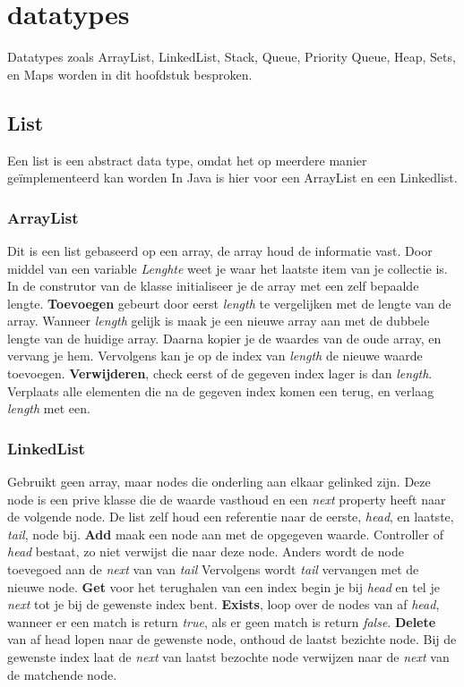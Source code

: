 \section{datatypes}
Datatypes zoals ArrayList, LinkedList, Stack, Queue, Priority Queue, Heap, Sets, en Maps worden in dit hoofdstuk besproken.

\subsection{List}
Een list is een abstract data type, omdat het op meerdere manier geïmplementeerd kan worden
In Java is hier voor een ArrayList en een Linkedlist.

\subsubsection{ArrayList}
Dit is een list gebaseerd op een array, de array houd de informatie vast.
Door middel van een variable \textit{Lenghte} weet je waar het laatste item van je collectie is.
In de construtor van de klasse initialiseer je de array met een zelf bepaalde lengte.
\textbf{Toevoegen} gebeurt door eerst \textit{length} te vergelijken met de lengte van de array.
Wanneer \textit{length} gelijk is maak je een nieuwe array aan met de dubbele lengte van de huidige array.
Daarna kopier je de waardes van de oude array, en vervang je hem.
Vervolgens kan je op de index van \textit{length} de nieuwe waarde toevoegen.
\textbf{Verwijderen}, check eerst of de gegeven index lager is dan \textit{length}.
Verplaats alle elementen die na de gegeven index komen een terug, en verlaag \textit{length} met een.

\subsubsection{LinkedList}
Gebruikt geen array, maar nodes die onderling aan elkaar gelinked zijn.
Deze node is een prive klasse die de waarde vasthoud en een \textit{next} property heeft naar de volgende node.
De list zelf houd een referentie naar de eerste, \textit{head}, en laatste, \textit{tail}, node bij.
\textbf{Add} maak een node aan met de opgegeven waarde.
Controller of \textit{head} bestaat, zo niet verwijst die naar deze node.
Anders wordt de node toevegoed aan de \textit{next} van van \textit{tail}
Vervolgens wordt \textit{tail} vervangen met de nieuwe node.
\textbf{Get} voor het terughalen van een index begin je bij \textit{head} en tel je \textit{next} tot je bij de gewenste index bent.
\textbf{Exists}, loop over de nodes van af \textit{head}, wanneer er een match is return \textit{true}, als er geen match is return \textit{false}.
\textbf{Delete} van af head lopen naar de gewenste node, onthoud de laatst bezichte node. Bij de gewenste index laat de \textit{next} van laatst bezochte node verwijzen naar de \textit{next} van de matchende node.

